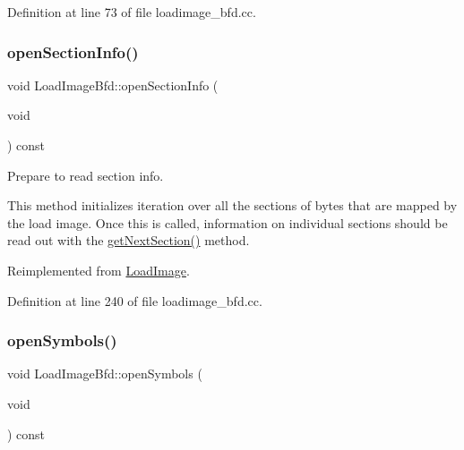 Definition at line 73 of file loadimage\+\_\+bfd.\+cc.

\mbox{\label{class_load_image_bfd_a48e82236ac85863f02e49e3ecae877e1}} 
\subsubsection{\texorpdfstring{openSectionInfo()}{openSectionInfo()}}
{\footnotesize\ttfamily void Load\+Image\+Bfd\+::open\+Section\+Info (\begin{DoxyParamCaption}\item[{void}]{ }\end{DoxyParamCaption}) const\hspace{0.3cm}{\ttfamily [virtual]}}



Prepare to read section info. 

This method initializes iteration over all the sections of bytes that are mapped by the load image. Once this is called, information on individual sections should be read out with the \mbox{\hyperlink{class_load_image_bfd_aaae78fac403213f2dc9ebf97ac28a5b2}{get\+Next\+Section()}} method. 

Reimplemented from \mbox{\hyperlink{class_load_image_a915fb52632f5d770511833ed1cb76088}{Load\+Image}}.



Definition at line 240 of file loadimage\+\_\+bfd.\+cc.

\mbox{\label{class_load_image_bfd_a55a11f9c90d067643acb55b197179878}} 
\subsubsection{\texorpdfstring{openSymbols()}{openSymbols()}}
{\footnotesize\ttfamily void Load\+Image\+Bfd\+::open\+Symbols (\begin{DoxyParamCaption}\item[{void}]{ }\end{DoxyParamCaption}) const\hspace{0.3cm}{\ttfamily [virtual]}}



